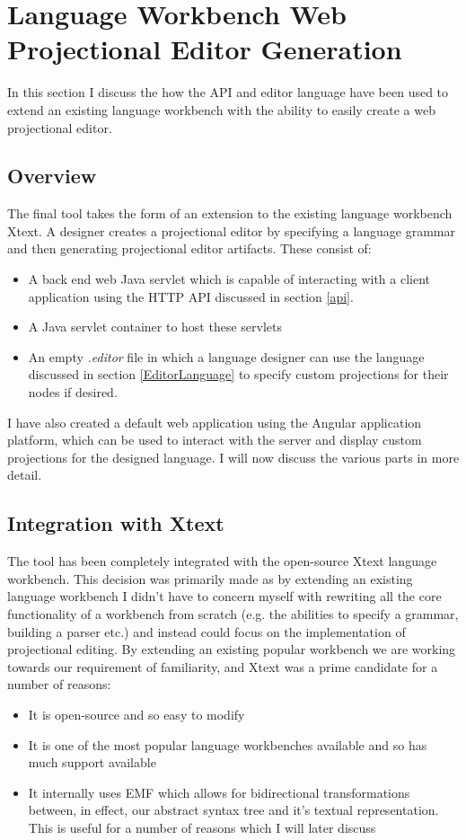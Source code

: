 \documentclass{report}
\begin{document}
\section{Language Workbench Web Projectional Editor Generation}
In this section I discuss the how the API and editor language have been used to extend an existing language workbench with the ability to easily create a web projectional editor.
\subsection{Overview}
The final tool takes the form of an extension to the existing language workbench Xtext. A designer creates a projectional editor by specifying a language grammar and then generating projectional editor artifacts. These consist of:
\begin{itemize}
\item A back end web Java servlet which is capable of interacting with a client application using the HTTP API discussed in section \ref{api}.
\item A Java servlet container to host these servlets
\item An empty \emph{.editor} file in which a language designer can use the language discussed in section \ref{EditorLanguage} to specify custom projections for their nodes if desired.  
\end{itemize}
I have also created a default web application using the Angular application platform\cite{angular}, which can be used to interact with the server and display custom projections for the designed language. I will now discuss the various parts in more detail.

\subsection{Integration with Xtext}\label{integrationWithXtext}
The tool has been completely integrated with the open-source Xtext language workbench. This decision was primarily made as by extending an existing language workbench I didn't have to concern myself with rewriting all the core functionality of a workbench from scratch (e.g. the abilities to specify a grammar, building a parser etc.) and instead could focus on the implementation of projectional editing. By extending an existing popular workbench we are working towards our \RFamiliarity requirement of familiarity, and Xtext was a prime candidate for a number of reasons:
\begin{itemize}
\item{It is open-source and so easy to modify}
\item{It is one of the most popular language workbenches available and so has much support available}
\item{It internally uses EMF which allows for bidirectional transformations between, in effect, our abstract syntax tree and it's textual representation. This is useful for a number of reasons which I will later discuss}
\end{itemize}
\end{document}
